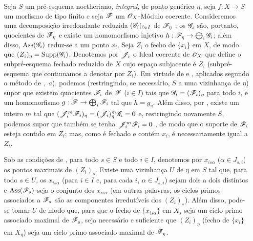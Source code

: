 \medskip
\noindent
\emph{}
\label{IV.9.8.2}
Seja $S$ um pré-esquema noetheriano, \emph{integral}, de ponto genérico $\eta$, seja $f:X\to S$ um morfismo de tipo finito e seja $\mathscr{F}$ um $\mathscr{O}_X$-Módulo coerente.
Consideremos uma decomposição irredondante reduzida $(\mathscr{G}_i)_{i\in I}$ de $\mathscr{F}_\eta$ ; os $\mathscr{G}_i$ são, portanto, quocientes de $\mathscr{F}_\eta$ e existe um homomorfismo injetivo $h:\sh{F}_\eta\to\bigoplus_i\sh{G}_i$; além disso, $\operatorname{Ass}(\mathscr{G}_i)$ reduz-se a um ponto $x_i$.
Seja $Z_i$ o fecho de $\{x_i\}$ em $X$, de modo que $(Z_i)_\eta=\operatorname{Supp}(\mathscr{G}_i)$.
Denotemos por $\mathscr{J}_i$ o Ideal coerente de $\mathscr{O}_X$ que define o subpré-esquema fechado reduzido de $X$ cujo espaço subjacente é $Z_i$ (subpré-esquema que continuamos a denotar por $Z_i$).
Em virtude de  e , aplicados segundo o método de ,~$a$), podemos (restringindo, se necessário, $S$ a uma vizinhança de $\eta$) supor que existem quocientes $\mathscr{F}_i$ de $\mathscr{F}$ ($i\in I$) tais que $\mathscr{G}_i=(\mathscr{F}_i)_\eta$ para todo $i$, e um homomorfismo $g:\sh{F}\to\bigoplus_i\sh{F}_i$ tal que $h=g_\eta$.
Além disso, por , existe um inteiro $m$ tal que $(\mathscr{J}_i^m\mathscr{F}_i)_\eta=(\mathscr{J}_i)_\eta^m\mathscr{G}_i=0$ e, restringindo novamente $S$, podemos supor que também se tenha $\mathscr{J}_i^m\mathscr{F}_i=0$ , de modo que o suporte de $\mathscr{F}_i$ esteja contido em $Z_i$; mas, como é fechado e contém $x_i$, é necessariamente igual a $Z_i$.

\begin{proposition}[9.8.3]
\label{IV.9.8.3}
Sob as condições de \emph{}, para todo $s\in S$ e todo $i\in I$, denotemos por $x_{is\alpha}$ ($\alpha\in J_{s,i}$) os pontos maximais de $(Z_i)_s$.
Existe uma vizinhança $U$ de $\eta$ em $S$ tal que, para todo $s\in U$, os $x_{is\alpha}$ (para $i\in I$ e, para cada $i$, $\alpha\in J_{s,i}$) sejam dois a dois distintos e $\operatorname{Ass}(\mathscr{F}_s)$ seja o conjunto dos $x_{is\alpha}$ (em outras palavras, os ciclos primos associados a $\mathscr{F}_s$ são as componentes irredutíveis dos $(Z_i)_s$).
Além disso, pode-se tomar $U$ de modo que, para que o fecho de $\{x_{is\alpha}\}$ em $X_s$ seja um ciclo primo associado maximal de $\mathscr{F}_s$, seja necessário e suficiente que $(Z_i)_\eta$ (fecho de $\{x_i\}$ em $X_\eta$) seja um ciclo primo associado maximal de $\mathscr{F}_\eta$.
\end{proposition}

